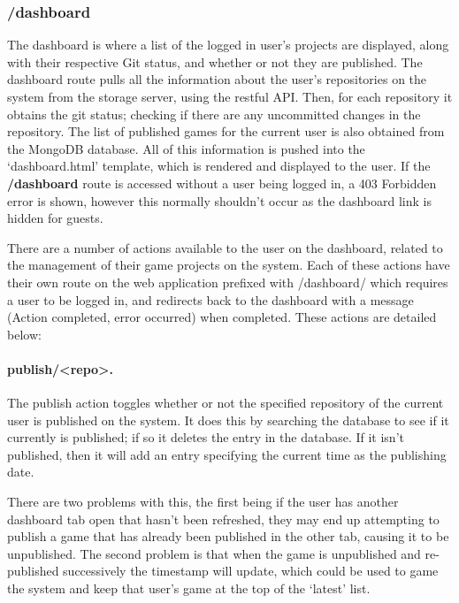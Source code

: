 	\subsubsection{/dashboard}
	The dashboard is where a list of the logged in user's projects are displayed, along with their respective Git status, and whether or not they are published. The dashboard route pulls all the information about the user's repositories on the system from the storage server, using the restful API. Then, for each repository it obtains the git status; checking if there are any uncommitted changes in the repository. The list of published games for the current user is also obtained from the MongoDB database. All of this information is pushed into the `dashboard.html' template, which is rendered and displayed to the user. If the \textbf{/dashboard} route is accessed without a user being logged in, a 403 Forbidden error is shown, however this normally shouldn't occur as the dashboard link is hidden for guests.

	There are a number of actions available to the user on the dashboard, related to the management of their game projects on the system. Each of these actions have their own route on the web application prefixed with /dashboard/ which requires a user to be logged in, and redirects back to the dashboard with a message (Action completed, error occurred) when completed. These actions are detailed below:

	\paragraph{publish/<repo>.}
	The publish action toggles whether or not the specified repository of the current user is published on the system. It does this by searching the database to see if it currently is published; if so it deletes the entry in the database. If it isn't published, then it will add an entry specifying the current time as the publishing date.

	There are two problems with this, the first being if the user has another dashboard tab open that hasn't been refreshed, they may end up attempting to publish a game that has already been published in the other tab, causing it to be unpublished. The second problem is that when the game is unpublished and re-published successively the timestamp will update, which could be used to game the system and keep that user's game at the top of the `latest' list.

